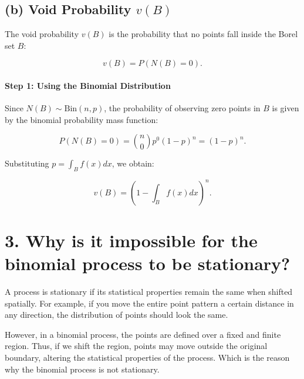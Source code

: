 \documentclass{article}
\begin{document}
\subsection*{(b) Void Probability $v(B)$}

The void probability $v(B)$ is the probability that no points fall inside the Borel set $B$:

\[
    v(B) = P(N(B) = 0).
\]

\paragraph{Step 1: Using the Binomial Distribution}
Since $N(B) \sim \text{Bin}(n, p)$, the probability of observing zero points in $B$ is given by the binomial probability mass function:

\[
    P(N(B) = 0) = \binom{n}{0} p^0 (1 - p)^n = (1 - p)^n.
\]

Substituting $p = \int_B f(x) dx$, we obtain:

\[
    v(B) = \left( 1 - \int_B f(x) dx \right)^n.
\]
\section*{3. Why is it impossible for the binomial process to be stationary?}
A process is stationary if its statistical properties remain the same when shifted spatially. 
For example, if you move the entire point pattern a certain distance in any direction, 
the distribution of points should look the same.

However, in a binomial process, the points are defined over a fixed and finite region. 
Thus, if we shift the region, points may move outside the original boundary, altering the statistical properties of the process. 
Which is the reason why the binomial process is not stationary.
\end{document}
